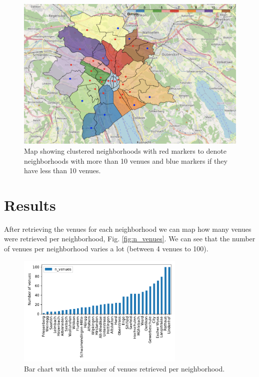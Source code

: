 \documentclass[a4paper,12pt,english]{article}
\begin{document}
\begin{figure}[h]
\centering
\includegraphics[width=1\linewidth]{map1}
\caption{Map showing clustered neighborhoods with red markers to denote neighborhoods with more than 10 venues and blue markers if they have less than 10 venues.}
\end{figure}\label{fig:map1}



\section{Results}
After retrieving the venues for each neighborhood we can map how many venues were retrieved per neighborhood, Fig. \ref{fig:n_venues}. We can see that the number of venues per neighborhood varies a lot (between 4 venues to 100).
\begin{figure}
\centering
\includegraphics[width=8cm]{n_venues.pdf}
\caption{Bar chart with the number of venues retrieved per neighborhood.}
\end{figure}\label{fig:n_venues}
\end{document}
